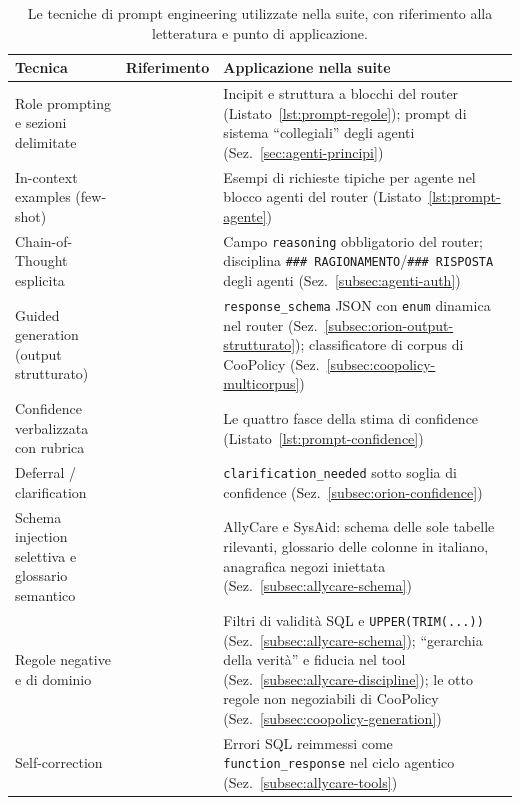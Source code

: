 \begin{table}[htbp]
  \centering
  \caption[Tecniche di prompt engineering nella suite]{Le tecniche di prompt engineering utilizzate nella suite, con riferimento alla letteratura e punto di applicazione.}
  \label{tab:eval-tecniche}
  \small
  \begin{tabular}{p{3.4cm}p{2.6cm}p{7.2cm}}
    \toprule
    \textbf{Tecnica} & \textbf{Riferimento} & \textbf{Applicazione nella suite} \\
    \midrule
    Role prompting e sezioni delimitate & \cite{sahoo2024prompteng_survey}
      & Incipit e struttura a blocchi del router (Listato~\ref{lst:prompt-regole}); prompt di sistema ``collegiali'' degli agenti (Sez.~\ref{sec:agenti-principi}) \\
    In-context examples (few-shot) & \cite{brown2020gpt3}
      & Esempi di richieste tipiche per agente nel blocco agenti del router (Listato~\ref{lst:prompt-agente}) \\
    Chain-of-Thought esplicita & \cite{wei2022cot}
      & Campo \texttt{reasoning} obbligatorio del router; disciplina \texttt{\#\#\# RAGIONAMENTO}/\texttt{\#\#\# RISPOSTA} degli agenti (Sez.~\ref{subsec:agenti-auth}) \\
    Guided generation (output strutturato) & \cite{willard2023outlines}
      & \texttt{response\_schema} JSON con \texttt{enum} dinamica nel router (Sez.~\ref{subsec:orion-output-strutturato}); classificatore di corpus di CooPolicy (Sez.~\ref{subsec:coopolicy-multicorpus}) \\
    Confidence verbalizzata con rubrica & \cite{kadavath2022knowsknows}
      & Le quattro fasce della stima di confidence (Listato~\ref{lst:prompt-confidence}) \\
    Deferral / clarification & \cite{settles2012active,diao2023activeprompting}
      & \texttt{clarification\_needed} sotto soglia di confidence (Sez.~\ref{subsec:orion-confidence}) \\
    Schema injection selettiva e glossario semantico & \cite{pourreza2023dinsql}
      & AllyCare e SysAid: schema delle sole tabelle rilevanti, glossario delle colonne in italiano, anagrafica negozi iniettata (Sez.~\ref{subsec:allycare-schema}) \\
    Regole negative e di dominio & \cite{sahoo2024prompteng_survey}
      & Filtri di validità SQL e \texttt{UPPER(TRIM(...))} (Sez.~\ref{subsec:allycare-schema}); ``gerarchia della verità'' e fiducia nel tool (Sez.~\ref{subsec:allycare-discipline}); le otto regole non negoziabili di CooPolicy (Sez.~\ref{subsec:coopolicy-generation}) \\
    Self-correction & \cite{pourreza2023dinsql}
      & Errori SQL reimmessi come \texttt{function\_response} nel ciclo agentico (Sez.~\ref{subsec:allycare-tools}) \\
    \bottomrule
  \end{tabular}
\end{table}

